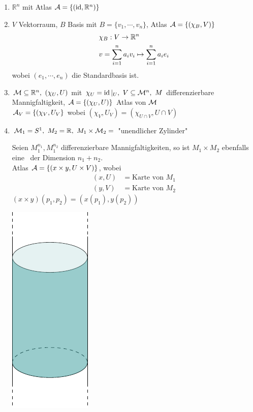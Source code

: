 \begin{bsp}
\begin{enumerate}
\item$\mathbb{R}^n$ mit Atlas $\mathcal{A} = \{(\operatorname{id}, \mathbb{R}^n)\}$
\item$V$ Vektorraum, $B$ Basis mit $B = \{v_1, \cdots, v_n\}$, Atlas $\mathcal{A} = \left\{(\chi_B, V)\right\}$
\begin{align*}
& \chi_B: V \rightarrow \mathbb{R}^n\\
& v = \sum^n_{i=1} a_i v_i \mapsto \sum_{i=1}^n a_i e_i
\end{align*}
wobei $(e_1, \cdots, e_n)$ die Standardbasis ist.
\item$\mathcal{M} \subseteq \mathbb{R}^n,\ (\chi_U, U)$ mit $\chi_U = \operatorname{id}\vert_U,\ V \subseteq \mathcal{M}^n,\ M$ differenzierbare Mannigfaltigkeit, $\mathcal{A} = \left\{(\chi_U, U)\right\}$ Atlas von $\mathcal{M}$\\
$\mathcal{A}_V = \left\{(\chi_V, U_V\right\}$ wobei $(\chi_V, U_V) = (\chi_{U\cap V}, U\cap V)$
\item$\mathcal{M}_1 = S^1,\ M_2 = \mathbb{R},\ M_1\times \mathcal{M}_2 =$ "unendlicher Zylinder"

\hspace{.06\textwidth}
\begin{minipage}[H]{0.8\textwidth}
Seien $M_1^{n_1}, M_1^{n_2}$ differenzierbare Mannigfaltigkeiten, so ist $M_1\times M_2$ ebenfalls eine \difM \ der Dimension $n_1 + n_2$.\\
Atlas $\mathcal{A} = \left\{(x\times y, U\times V)\right\}$, wobei 
\begin{align*}
(x, U) &= \text{Karte von } M_1\\
(y, V) &= \text{Karte von } M_2
\end{align*}
$(x\times y)(p_1, p_2) = (x(p_1), y(p_2))$
\end{minipage}
\hspace{1cm}
\begin{minipage}[H]{.2\textwidth}
\vspace{-1.5cm}
\includegraphics[scale=0.5]{figures/tikz/cylinder.pdf}
\end{minipage}


\end{enumerate}
\end{bsp}
